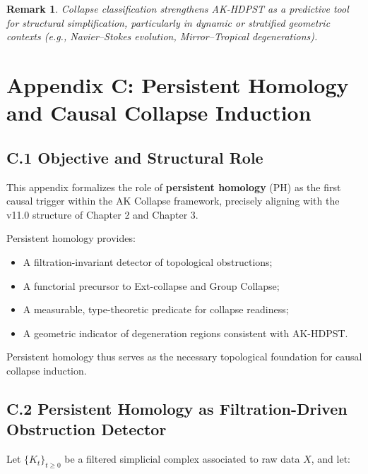 \documentclass[11pt]{article}
\newtheorem{remark}[theorem]{Remark}
\begin{document}
\begin{remark}
Collapse classification strengthens AK-HDPST as a predictive tool for structural simplification, particularly in dynamic or stratified geometric contexts (e.g., Navier–Stokes evolution, Mirror–Tropical degenerations).
\end{remark}



\section*{Appendix C: Persistent Homology and Causal Collapse Induction}

\subsection*{C.1 Objective and Structural Role}

This appendix formalizes the role of \textbf{persistent homology} (PH) as the first causal trigger within the AK Collapse framework, precisely aligning with the v11.0 structure of Chapter 2 and Chapter 3.

Persistent homology provides:

\begin{itemize}
    \item A filtration-invariant detector of topological obstructions;
    \item A functorial precursor to Ext-collapse and Group Collapse;
    \item A measurable, type-theoretic predicate for collapse readiness;
    \item A geometric indicator of degeneration regions consistent with AK-HDPST.
\end{itemize}

Persistent homology thus serves as the necessary topological foundation for causal collapse induction.

\subsection*{C.2 Persistent Homology as Filtration-Driven Obstruction Detector}

Let \( \{ K_t \}_{t \geq 0} \) be a filtered simplicial complex associated to raw data \( X \), and let:
\end{document}
